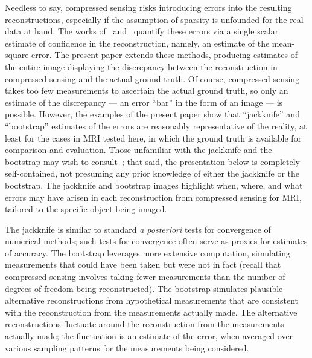 \documentclass[article]{jdssv}
\begin{document}
Needless to say, compressed sensing risks introducing errors
into the resulting reconstructions, especially if the assumption of sparsity
is unfounded for the real data at hand. The works
of~\citet{malioutov-sanghavi-willsky} and~\citet{ward}
quantify these errors via a single scalar estimate of confidence
in the reconstruction, namely, an estimate of the mean-square error.
The present paper extends these methods, producing estimates
of the entire image displaying the discrepancy between the reconstruction
in compressed sensing and the actual ground truth.
Of course, compressed sensing takes too few measurements to ascertain
the actual ground truth, so only an estimate of the discrepancy
--- an error ``bar'' in the form of an image --- is possible.
However, the examples of the present paper show that ``jackknife''
and ``bootstrap'' estimates of the errors are reasonably representative
of the reality, at least for the cases in MRI tested here,
in which the ground truth is available for comparison and evaluation.
Those unfamiliar with the jackknife and the bootstrap may wish
to consult~\citet{efron-tibshirani};
that said, the presentation below is completely self-contained,
not presuming any prior knowledge of either the jackknife or the bootstrap.
The jackknife and bootstrap images highlight when, where, and what errors
may have arisen in each reconstruction from compressed sensing for MRI,
tailored to the specific object being imaged.

The jackknife is similar to standard {\it a posteriori} tests for convergence
of numerical methods; such tests for convergence
often serve as proxies for estimates of accuracy.
The bootstrap leverages more extensive computation, simulating measurements
that could have been taken but were not in fact
(recall that compressed sensing involves taking fewer measurements
than the number of degrees of freedom being reconstructed).
The bootstrap simulates plausible alternative reconstructions
from hypothetical measurements that are consistent
with the reconstruction from the measurements actually made.
The alternative reconstructions fluctuate around the reconstruction
from the measurements actually made;
the fluctuation is an estimate of the error,
when averaged over various sampling patterns
for the measurements being considered.
\end{document}
